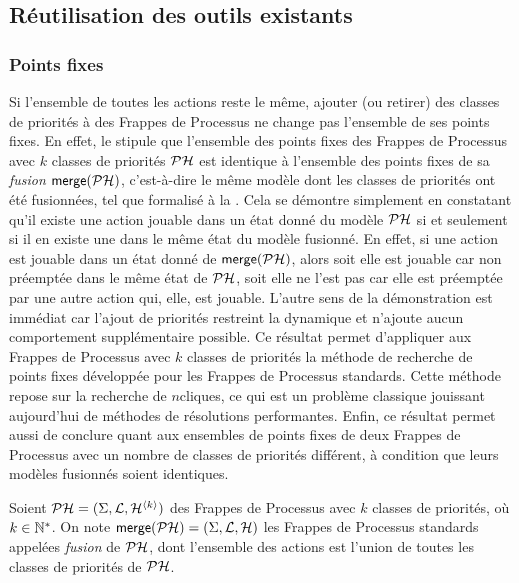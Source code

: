 \subsection{Réutilisation des outils existants}



\subsubsection{Points fixes}


Si l'ensemble de toutes les actions reste le même,
ajouter (ou retirer) des classes de priorités à des Frappes de Processus ne change pas
l'ensemble de ses points fixes.
En effet, le  stipule que
l'ensemble des points fixes des Frappes de Processus avec $k$
classes de priorités $\mathcal{PH}$ est identique à l'ensemble des points fixes de
sa \emph{fusion} $\mathsf{merge}(\mathcal{PH})$,
c'est-à-dire le même modèle dont les classes de priorités ont été fusionnées,
tel que formalisé à la .
Cela se démontre simplement en constatant qu'il existe une action jouable dans un état donné du
modèle $\mathcal{PH}$ si et seulement si il en existe une dans le même état du modèle fusionné.
En effet, si une action est jouable dans un état donné de $\mathsf{merge}(\mathcal{PH})$,
alors soit elle est jouable car non préemptée dans le même état de $\mathcal{PH}$,
soit elle ne l'est pas car elle est préemptée par une autre action qui, elle, est jouable.
L'autre sens de la démonstration est immédiat car l'ajout de priorités restreint la dynamique
et n'ajoute aucun comportement supplémentaire possible.
Ce résultat permet d'appliquer aux Frappes de Processus avec $k$ classes de priorités
la méthode de recherche de points fixes développée pour les Frappes de Processus standards.
Cette méthode repose sur la recherche de $n$\nbd cliques,
ce qui est un problème classique jouissant aujourd'hui de méthodes de résolutions performantes.
Enfin, ce résultat permet aussi de conclure quant aux ensembles de points fixes de deux Frappes
de Processus avec un nombre de classes de priorités différent, à condition que
leurs modèles fusionnés soient identiques.

\begin{definition}
  Soient $\mathcal{PH} = (\Sigma, \mathcal{L}, \mathcal{H}^{{\langle k \rangle}})$ des Frappes de Processus avec $k$
  classes de priorités, où $k \in \mathbb{N}^*$.
  On note $\mathsf{merge}(\mathcal{PH}) = (\Sigma, \mathcal{L}, \mathcal{H})$
  les Frappes de Processus standards appelées \emph{fusion} de $\mathcal{PH}$,
  dont l'ensemble des actions est l'union de toutes les classes de priorités de $\mathcal{PH}$.
\end{definition}

